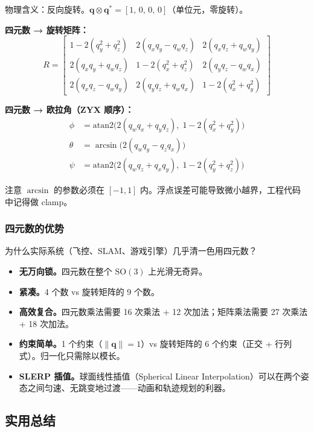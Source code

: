 物理含义：反向旋转。$\mathbf{q} \otimes \mathbf{q}^* = [1,\, 0,\, 0,\, 0]$（单位元，零旋转）。

\textbf{四元数 → 旋转矩阵：}
\begin{equation}
R = \begin{bmatrix}
1 - 2(q_y^2 + q_z^2) & 2(q_x q_y - q_w q_z) & 2(q_x q_z + q_w q_y) \\
2(q_x q_y + q_w q_z) & 1 - 2(q_x^2 + q_z^2) & 2(q_y q_z - q_w q_x) \\
2(q_x q_z - q_w q_y) & 2(q_y q_z + q_w q_x) & 1 - 2(q_x^2 + q_y^2)
\end{bmatrix}
\end{equation}

\textbf{四元数 → 欧拉角（ZYX 顺序）：}
\begin{align}
\phi &= \mathrm{atan2}\!\big(2(q_w q_x + q_y q_z),\; 1 - 2(q_x^2 + q_y^2)\big) \\
\theta &= \arcsin\!\big(2(q_w q_y - q_z q_x)\big) \\
\psi &= \mathrm{atan2}\!\big(2(q_w q_z + q_x q_y),\; 1 - 2(q_y^2 + q_z^2)\big)
\end{align}

注意 $\arcsin$ 的参数必须在 $[-1, 1]$ 内。浮点误差可能导致微小越界，工程代码中记得做 clamp。

\subsubsection{四元数的优势}

为什么实际系统（飞控、SLAM、游戏引擎）几乎清一色用四元数？

\begin{itemize}
    \item \textbf{无万向锁。}四元数在整个 $\mathrm{SO}(3)$ 上光滑无奇异。
    \item \textbf{紧凑。}4 个数 vs 旋转矩阵的 9 个数。
    \item \textbf{高效复合。}四元数乘法需要 16 次乘法 + 12 次加法；矩阵乘法需要 27 次乘法 + 18 次加法。
    \item \textbf{约束简单。}1 个约束（$\|\mathbf{q}\| = 1$）vs 旋转矩阵的 6 个约束（正交 + 行列式）。归一化只需除以模长。
    \item \textbf{SLERP 插值。}球面线性插值（Spherical Linear Interpolation）可以在两个姿态之间匀速、无跳变地过渡——动画和轨迹规划的利器。
\end{itemize}

\subsection{实用总结}

